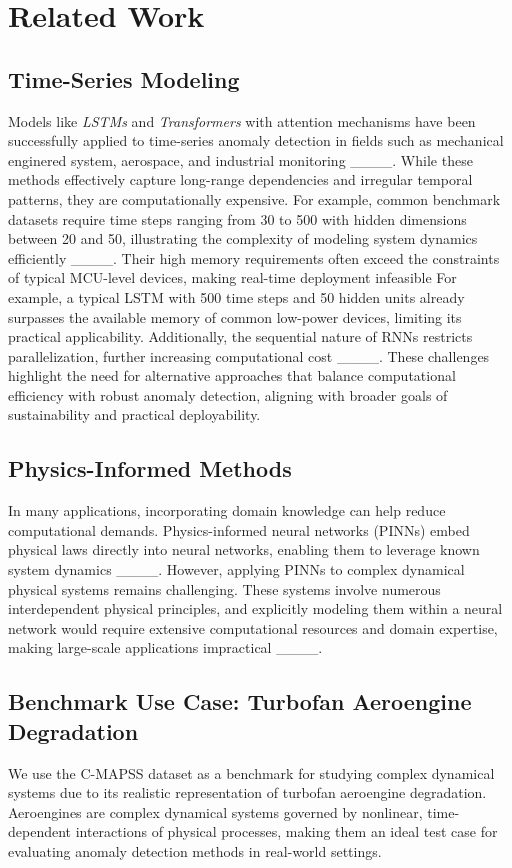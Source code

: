 \section{Related Work}
\subsection{Time-Series Modeling}
Models like \textit{LSTMs} and \textit{Transformers} with attention mechanisms have been successfully applied to time-series anomaly detection in fields such as mechanical enginered system, aerospace, and industrial monitoring ____. While these methods effectively capture long-range dependencies and irregular temporal patterns, they are computationally expensive. For example, common benchmark datasets require time steps ranging from 30 to 500 with hidden dimensions between 20 and 50, illustrating the complexity of modeling system dynamics efficiently ____. Their high memory requirements often exceed the constraints of typical MCU-level devices, making real-time deployment infeasible For example, a typical LSTM with 500 time steps and 50 hidden units already surpasses the available memory of common low-power devices, limiting its practical applicability. Additionally, the sequential nature of RNNs restricts parallelization, further increasing computational cost ____. These challenges highlight the need for alternative approaches that balance computational efficiency with robust anomaly detection, aligning with broader goals of sustainability and practical deployability. \par
\subsection{Physics-Informed Methods}
In many applications, incorporating domain knowledge can help reduce computational demands. Physics-informed neural networks (PINNs) embed physical laws directly into neural networks, enabling them to leverage known system dynamics ____. However, applying PINNs to complex dynamical physical systems remains challenging. These systems involve numerous interdependent physical principles, and explicitly modeling them within a neural network would require extensive computational resources and domain expertise, making large-scale applications impractical ____.

\subsection{Benchmark Use Case: Turbofan Aeroengine Degradation}
We use the C-MAPSS dataset as a benchmark for studying complex dynamical systems due to its realistic representation of turbofan aeroengine degradation. Aeroengines are complex dynamical systems governed by nonlinear, time-dependent interactions of physical processes, making them an ideal test case for evaluating anomaly detection methods in real-world settings.\par

